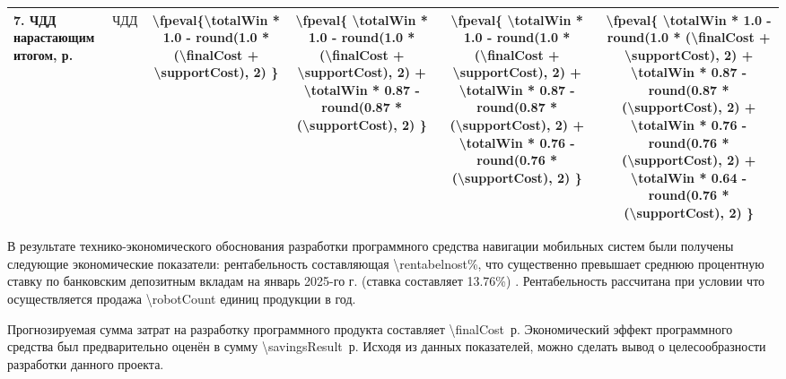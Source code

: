 \begin{table}
\begin{tabular}{|p{3.1cm}|p{1.5cm}|c|c|c|c|}
		7. ЧДД нарастающим итогом, р.
		& $\text{ЧДД}$
		& \num{\fpeval{\totalWin * 1.0  -  round(1.0 * (\finalCost + \supportCost), 2)     }}
		& \num{\fpeval{
			\totalWin * 1.0  -  round(1.0 * (\finalCost + \supportCost), 2) +
			\totalWin * 0.87 -  round(0.87 * (\supportCost), 2) }}
		& \num{\fpeval{
			\totalWin * 1.0  -  round(1.0 * (\finalCost + \supportCost), 2) +
			\totalWin * 0.87 -  round(0.87 * (\supportCost), 2) +
			\totalWin * 0.76 -  round(0.76 * (\supportCost), 2) 
		}}
		& \num{\fpeval{
			\totalWin * 1.0  -  round(1.0 * (\finalCost + \supportCost), 2) +
			\totalWin * 0.87 -  round(0.87 * (\supportCost), 2) +
			\totalWin * 0.76 -  round(0.76 * (\supportCost), 2) +
			\totalWin * 0.64 -  round(0.76 * (\supportCost), 2) 
		}}
		\\ \hline

	\end{tabular}
\end{table}
\egroup



В результате технико-экономического обоснования разработки программного
средства навигации мобильных систем были получены следующие экономические
показатели: рентабельность составляющая \num{\rentabelnost}\%, что существенно
превышает среднюю процентную ставку по банковским депозитным вкладам на январь
2025-го г. (ставка составляет \num{13,76}\%) \cite{nbrb2025}. Рентабельность
рассчитана при условии что осуществляется продажа \num{\robotCount} единиц
продукции в год. 

Прогнозируемая сумма затрат на разработку программного продукта
составляет \num{\finalCost}~р. Экономический эффект программного
средства был предварительно оценён в сумму \num{\savingsResult}~р. Исходя из
данных показателей, можно сделать вывод о целесообразности разработки данного
проекта.


\renewcommand{\bibsection}{\sectioncentered*{Список использованной литературы}}


